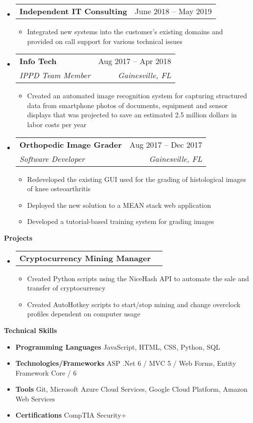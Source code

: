 \documentclass[letterpaper,12pt]{article}[leftmargin=*]
\makeatletter
\def \entryspacing {-0pt}
\renewcommand{\section}[2]{\vspace{5pt}
  \colorbox{secondary}{\color{white}\raggedbottom\normalsize\textbf{{#1}{\hspace{7pt}#2}}}
}
\newcommand{\resumeEntryStart}{\begin{itemize}[leftmargin=2.5mm]}
\newcommand{\resumeEntryEnd}{\end{itemize}\vspace{\entryspacing}}
\newcommand{\resumeItemListStart}{\begin{itemize}[leftmargin=4.5mm]}
\newcommand{\resumeItemListEnd}{\end{itemize}}
\newcommand{\resumeItem}[1]{
  \item\small{
    {#1 \vspace{-2pt}}
  }
}
\newcommand{\resumeEntryTSDL}[4]{
  \vspace{-1pt}\item[]
    \begin{tabularx}{0.97\textwidth}{X@{\hspace{60pt}}r}
      \textbf{\color{primary}#1} & {\firabook\color{accent}\small#2} \\
      \textit{\color{accent}\small#3} & \textit{\color{accent}\small#4} \\
    \end{tabularx}\vspace{-6pt}
}
\newcommand{\resumeEntryTD}[2]{
  \vspace{-1pt}\item[]
    \begin{tabularx}{0.97\textwidth}{X@{\hspace{60pt}}r}
      \textbf{\color{primary}#1} & {\firabook\color{accent}\small#2} \\
    \end{tabularx}\vspace{-6pt}
}
\newcommand{\resumeEntryS}[2]{
  \item[]\small{
    \textbf{\color{primary}#1 }{ #2 \vspace{-6pt}}
  }
}
\makeatother
\begin{document}
  \resumeEntryStart
    \resumeEntryTD
      {Independent IT Consulting}{June 2018 -- May 2019}
    \resumeItemListStart
      \resumeItem {Integrated new systems into the customer's existing domains and provided on call support for various technical issues}
    \resumeItemListEnd
  \resumeEntryEnd

  \resumeEntryStart
    \resumeEntryTSDL
      {Info Tech}{Aug 2017 -- Apr 2018}
      {IPPD Team Member}{Gainesville, FL}
    \resumeItemListStart
        \resumeItem {Created an automated image recognition system for capturing structured data from smartphone photos of documents, equipment and sensor displays that was projected to save an estimated 2.5 million dollars in labor costs per year}
    \resumeItemListEnd
  \resumeEntryEnd

  \resumeEntryStart
    \resumeEntryTSDL
      {Orthopedic Image Grader}{Aug 2017 -- Dec 2017}
      {Software Developer}{Gainesville, FL}
    \resumeItemListStart
      \resumeItem {Redeveloped the existing GUI used for the grading of histological images of knee osteoarthritis}
      \resumeItem {Deployed the new solution to a MEAN stack web application}
      \resumeItem {Developed a tutorial-based training system for grading images}
    \resumeItemListEnd
  \resumeEntryEnd


\section{\faFlask}{Projects}

  \resumeEntryStart
    \resumeEntryTD
      {Cryptocurrency Mining Manager}{}
    \resumeItemListStart
      \resumeItem {Created Python scripts using the NiceHash API to automate the sale and transfer of cryptocurrency}
      \resumeItem {Created AutoHotkey scripts to start/stop mining and change overclock profiles dependent on computer usage}
    \resumeItemListEnd
  \resumeEntryEnd
  
\section{\faGears}{Technical Skills}
 \resumeEntryStart
  \resumeEntryS{Programming Languages } {JavaScript, HTML, CSS, Python, SQL}
  \resumeEntryS{Technologies/Frameworks } {ASP .Net 6 / MVC 5 / Web Forms, Entity Framework Core / 6}
  \resumeEntryS{Tools } {Git, Microsoft Azure Cloud Services, Google Cloud Platform, Amazon Web Services}
  \resumeEntryS{Certifications } {CompTIA Security+}
 \resumeEntryEnd
\end{document}
